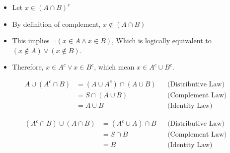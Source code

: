 \documentclass[12pt]{article}
\begin{document}
\begin{enumerate}
\begin{itemize}
        \item Let $x \in (A\cap B)^c$
        \item By definition of complement, $x\notin (A\cap B)$
        \item This implies $\neg(x\in A \land x\in B)$, Which is logically equivalent to $(x \notin A) \lor (x\notin B)$.
        \item Therefore, $x \in A^c \lor x \in B^c$, which mean $x \in A^c \cup B^c$.
\end{itemize}
\begin{align*}
    A \cup (A^c \cap B) &= (A \cup A^c) \cap (A \cup B) && \text{(Distributive Law)} \\
    &= S \cap (A \cup B) && \text{(Complement Law)} \\
    &= A \cup B && \text{(Identity Law)}
\end{align*}


\begin{align*}
    (A^c \cap B) \cup (A \cap B) &= (A^c \cup A) \cap B && \text{(Distributive Law)} \\
    &= S \cap B && \text{(Complement Law)} \\
    &= B && \text{(Identity Law)}
\end{align*}

\end{enumerate}
\end{document}
